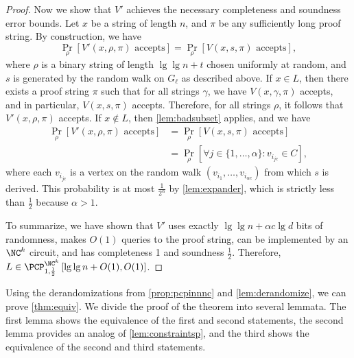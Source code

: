 \documentclass[]{article}
\newcommand{\PCPcs}[5]{\PCP^{#1}_{#2, #3}\left[#4, #5\right]}
\begin{document}
\begin{proof}
  Now we show that $V'$ achieves the necessary completeness and soundness error bounds.
  Let $x$ be a string of length $n$, and $\pi$ be any sufficiently long proof string.
  By construction, we have
  \begin{equation*}
    \Pr_\rho[V'(x, \rho, \pi) \text{ accepts}] = \Pr_\rho[V(x, s, \pi) \text{ accepts}],
  \end{equation*}
  where $\rho$ is a binary string of length $\lg \lg n + t$ chosen uniformly at random, and $s$ is generated by the random walk on $G_\ell$ as described above.
  If $x \in L$, then there exists a proof string $\pi$ such that for all strings $\gamma$, we have $V(x, \gamma, \pi)$ accepts, and in particular, $V(x, s, \pi)$ accepts.
  Therefore, for all strings $\rho$, it follows that $V'(x, \rho, \pi)$ accepts.
  If $x \notin L$, then \autoref{lem:badsubset} applies, and we have
  \begin{align*}
    \Pr_\rho[V'(x, \rho, \pi) \text{ accepts}] & = \Pr_\rho[V(x, s, \pi) \text{ accepts}] \\
    & = \Pr_\rho[\forall j \in \{1, \dotsc, \alpha\} \colon v_{i_{jc}} \in C],
  \end{align*}
  where each $v_{i_{jc}}$ is a vertex on the random walk $(v_{i_1}, \dotsc, v_{i_{\alpha c}})$ from which $s$ is derived.
  This probability is at most $\frac{1}{2^\alpha}$ by \autoref{lem:expander}, which is strictly less than $\frac{1}{2}$ because $\alpha > 1$.

  To summarize, we have shown that $V'$ uses exactly $\lg \lg n + \alpha c \lg d$ bits of randomness, makes $O(1)$ queries to the proof string, can be implemented by an $\NC^k$ circuit, and has completeness 1 and soundness $\frac{1}{2}$.
  Therefore, $L \in \PCPcs{\NC^k}{1}{\frac{1}{2}}{\lg \lg n + O(1)}{O(1)}$.
\end{proof}

Using the derandomizations from \autoref{prop:pcpinnnc} and \autoref{lem:derandomize}, we can prove \autoref{thm:equiv}.
We divide the proof of the theorem into several lemmata.
The first lemma shows the equivalence of the first and second statements, the second lemma provides an \NC{} analog of \autoref{lem:constraintsp}, and the third shows the equivalence of the second and third statements.
\end{document}
